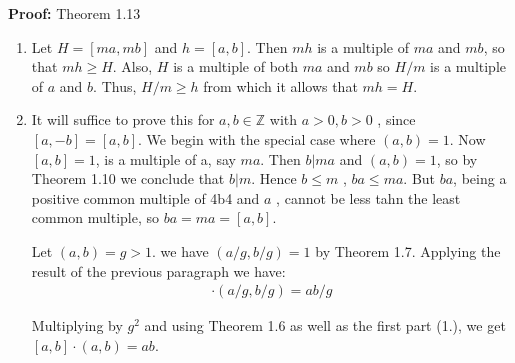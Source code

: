 \documentclass[a4paper]{article}
\begin{document}
\textbf{Proof:} Theorem 1.13

\begin{enumerate}
\item Let $H=[ma,mb]$ and $h=[a,b]$. Then $mh$ is a multiple of $ma$ and
$mb$, so that $mh\geq H$. Also, $H$ is a multiple of both $ma$ and $mb$ so
$H/m$ is a multiple of $a$ and $b$. Thus, $H/m \geq h$ from which it allows
that $mh=H$.

\item It will suffice to prove this for $a,b\in\mathbb{Z}$ with $a>0,b>0$
, since $[a,-b]=[a,b]$. We begin with the special case where $(a,b)=1$. Now
$[a,b]=1$, is a multiple of a, say $ma$. Then $b|ma$ and $(a,b)=1$, so by
Theorem 1.10 we conclude that $b|m$. Hence $b \leq m$ , $ba\leq ma$. But
$ba$, being a positive common multiple of 4b4 and $a$ , cannot be less tahn
the least common multiple, so $ba=ma=[a,b]$.

Let $(a,b)=g>1$. we have $(a/g,b/g)=1$ by Theorem 1.7. Applying the result
of the previous paragraph we have:
\begin{align*}
[a/g,b/g]\cdot(a/g,b/g)=ab/g
\end{align*}

Multiplying by $g^2$ and using Theorem 1.6 as well as the first part (1.),
we get $[a,b]\cdot(a,b)=ab$.
\end{enumerate}
\end{document}
